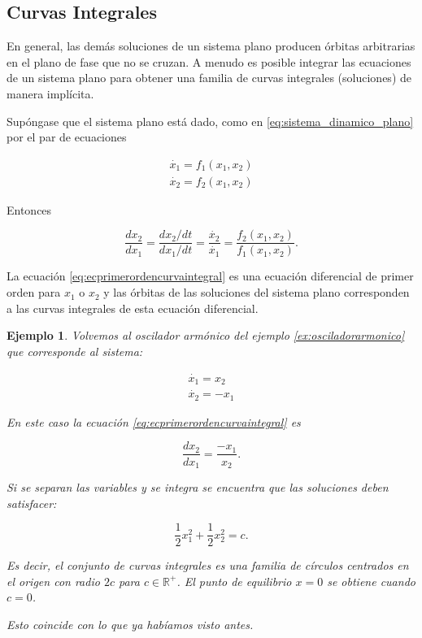 \documentclass[11pt]{book}
\theoremstyle{definition}
\numberwithin{definition}{section}
\theoremstyle{theorem}
\numberwithin{theorem}{section}
\numberwithin{lemma}{section}
\numberwithin{corollary}{section}
\theoremstyle{plain}
\newtheorem{example}{Ejemplo}
\numberwithin{example}{section}
\newcommand{\R}{{\ensuremath{\mathbb{R}}}}
\begin{document}
\subsection{Curvas Integrales}

En general, las demás soluciones de un sistema plano producen órbitas arbitrarias en el plano de fase que no se cruzan.
A menudo es posible integrar las ecuaciones de un sistema plano para obtener una familia de curvas integrales (soluciones) de manera implícita.

Supóngase que el sistema plano está dado, como en \ref{eq:sistema_dinamico_plano} por el par de ecuaciones

$$
\begin{array}{l}
	\dot{x_1} = f_1(x_1,x_2) \\
	\dot{x_2} = f_2(x_1,x_2)
\end{array}
$$

Entonces

\begin{equation} \label{eq:ecprimerordencurvaintegral}
	\dfrac{dx_2}{dx_1} = \frac{dx_2/dt}{dx_1/dt} = \frac{\dot{x_2}}{\dot{x_1}} = \dfrac{f_2(x_1,x_2)}{f_1(x_1,x_2)}.
\end{equation}

La ecuación \ref{eq:ecprimerordencurvaintegral} es una ecuación diferencial de primer orden para $x_1$ o $x_2$ y las órbitas de las soluciones del sistema plano corresponden a las curvas integrales de esta ecuación diferencial.

\begin{example}
Volvemos al oscilador armónico del ejemplo \ref{ex:osciladorarmonico} que corresponde al sistema:

$$
\begin{array}{l}
	\dot{x_1} = x_2 \\
	\dot{x_2} = -x_1
\end{array}
$$

En este caso la ecuación \ref{eq:ecprimerordencurvaintegral} es

$$ \dfrac{dx_2}{dx_1} = \frac{-x_1}{x_2}.$$

Si se separan las variables y se integra se encuentra que las soluciones deben satisfacer:

$$ \frac{1}{2}x_1^2 + \frac{1}{2}x_2^2 = c.$$

Es decir, el conjunto de curvas integrales es una familia de círculos centrados en el origen con radio $2c$ para $c \in \R^+$. El punto de equilibrio $x = 0$ se obtiene cuando $c = 0$.

Esto coincide con lo que ya habíamos visto antes.
\end{example}
\end{document}
